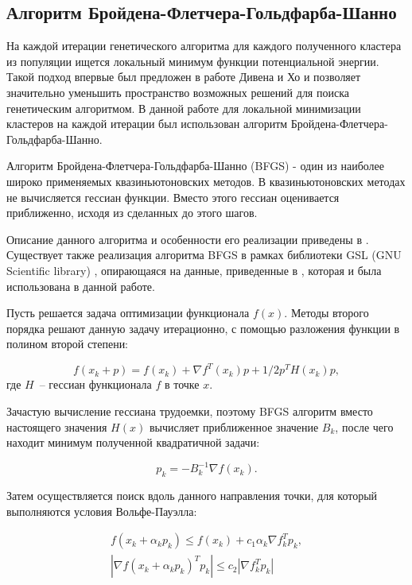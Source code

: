 \subsection{Алгоритм Бройдена-Флетчера-Гольдфарба-Шанно}
\label{sec:2d}

На каждой итерации генетического алгоритма для каждого полученного кластера из
популяции ищется локальный минимум функции потенциальной энергии. Такой подход
впервые был предложен в работе Дивена и Хо \cite{Deaven1995} и позволяет значительно
уменьшить пространство возможных решений для поиска генетическим алгоритмом.
В данной работе для локальной минимизации кластеров на каждой итерации был использован
алгоритм Бройдена-Флетчера-Гольдфарба-Шанно.

Алгоритм Бройдена-Флетчера-Гольдфарба-Шанно (BFGS) - один из наиболее широко применяемых
квазиньютоновских методов. В квазиньютоновских методах не вычисляется гессиан функции.
Вместо этого гессиан оценивается приближенно, исходя из сделанных до этого шагов.

Описание данного алгоритма и особенности его реализации приведены в \cite{Fletcher1987}.
Существует также реализация алгоритма BFGS в рамках библиотеки GSL (GNU Scientific library)
\cite{gsl}, опирающаяся на данные, приведенные в \cite{Fletcher1987}, которая
и была использована в данной работе.

Пусть решается задача оптимизации функционала $f(x)$. Методы второго порядка решают данную задачу
итерационно, с помощью разложения функции в полином второй степени:

\begin{equation}
  f(x_{k}+p) = f(x_k) + \nabla f^{T}(x_k)p + 1/2p^{T}H(x_k)p,
\end{equation}
где $H$~-- гессиан функционала $f$ в точке $x$.

Зачастую вычисление гессиана трудоемки, поэтому BFGS алгоритм вместо настоящего значения $H(x)$ вычисляет
приближенное значение $B_k$, после чего находит минимум полученной квадратичной задачи:

\begin{equation}
  p_k = -B_{k}^{-1} \nabla f(x_k).
\end{equation}

Затем осуществляется поиск вдоль данного направления точки, для который выполняются условия Вольфе-Пауэлла:

\begin{equation}
  \label{search_constr}
  \begin{array}{l}
    f(x_k + \alpha_{k}p_k) \leq f(x_k) + c_1 \alpha_k \nabla f_{k}^{T}p_k, \\
    |\nabla f(x_k + \alpha_{k}p_k)^{T}p_k| \leq c_2 |\nabla f_{k}^{T}p_k|
  \end{array}
\end{equation}

